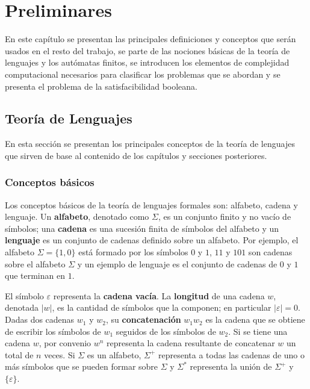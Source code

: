\documentclass{report}
\theoremstyle{definition}
\theoremstyle{plain}
\theoremstyle{remark}
\begin{document}
\chapter{Preliminares}
\label{cap:preliminares}

En este capítulo se presentan las principales definiciones y conceptos que
serán usados en el resto del trabajo, se parte de las nociones básicas de la
teoría de lenguajes y los autómatas finitos, se introducen los elementos de
complejidad computacional necesarios para clasificar los problemas que se
abordan y se presenta el problema de la satisfacibilidad booleana.

\section{Teoría de Lenguajes}
\label{sec:teoria-lenguajes}

En esta sección se presentan los principales conceptos de la teoría de
lenguajes que sirven de base al contenido de los capítulos y secciones
posteriores.

\subsection{Conceptos básicos}

Los conceptos básicos de la teoría de lenguajes formales son: alfabeto,
cadena y lenguaje. Un \textbf{alfabeto}, denotado como $\Sigma$, es un
conjunto finito y no vacío de símbolos; una \textbf{cadena} es una sucesión
finita de símbolos del alfabeto y un \textbf{lenguaje} es un conjunto de
cadenas definido sobre un alfabeto. Por ejemplo, el alfabeto
$\Sigma = \{1, 0\}$ está formado por los símbolos $0$ y $1$, $11$ y $101$
son cadenas sobre el alfabeto $\Sigma$ y un ejemplo de lenguaje es el
conjunto de cadenas de $0$ y $1$ que terminan en $1$.

El símbolo $\varepsilon$ representa la \textbf{cadena vacía}. La
\textbf{longitud} de una cadena $w$, denotada $|w|$, es la cantidad de
símbolos que la componen; en particular $|\varepsilon| = 0$. Dadas dos
cadenas $w_1$ y $w_2$, su \textbf{concatenación} $w_1 w_2$ es la cadena que
se obtiene de escribir los símbolos de $w_1$ seguidos de los símbolos de
$w_2$. Si se tiene una cadena $w$, por convenio $w^n$ representa la cadena
resultante de concatenar $w$ un total de $n$ veces. Si $\Sigma$ es un
alfabeto, $\Sigma^+$ representa a todas las cadenas de uno o más símbolos
que se pueden formar sobre $\Sigma$ y $\Sigma^*$ representa la unión de
$\Sigma^+$ y $\{\varepsilon\}$.
\end{document}
